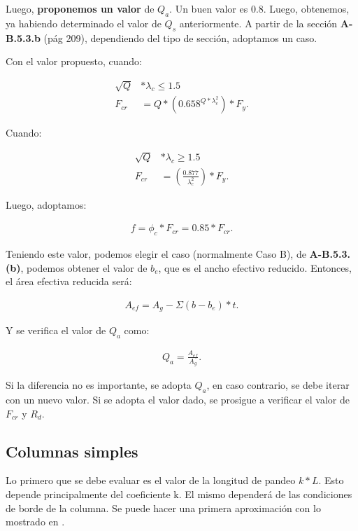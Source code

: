 \documentclass[../main.tex]{subfiles}
\begin{document}
Luego, \textbf{proponemos un valor} de $Q_a$. Un buen valor es 0.8. Luego,
obtenemos, ya habiendo determinado el valor de $Q_s$ anteriormente.
A partir de la sección \textbf{A-B.5.3.b} (pág 209), dependiendo del tipo de 
sección, adoptamos un caso.

Con el valor propuesto, cuando:

\begin{align*}
  \sqrt{Q} &* \lambda_c  \leq 1.5 \\[5pt]
  F_{cr} &= Q*\left( 0.658^{Q*\lambda_c^2} \right)*F_y \tag{A-B.5.15}
.\end{align*}

Cuando:

\begin{align*}
  \sqrt{Q} &* \lambda_c  \geq 1.5 \\[5pt]
  F_{cr} &= \left( \frac{0.877}{\lambda_c^2} \right) * F_y \tag{A-B.5.16}
.\end{align*}

Luego, adoptamos:

\begin{align*}
  f = \phi_c * F_{cr} = 0.85 * F_{cr}
.\end{align*}

Teniendo este valor, podemos elegir el caso (normalmente Caso B), de 
\textbf{A-B.5.3.(b)}, podemos obtener el valor de $b_e$, que es el ancho
efectivo reducido. Entonces, el área efectiva reducida será:

\begin{align*}
  A_{ef} = A_{g} - \Sigma (b-b_e)*t
.\end{align*}
 
Y se verifica el valor de $Q_a$ como:

 \begin{align*}
   Q_a = \frac{A_{ef}}{A_g}
.\end{align*}

Si la diferencia no es importante, se adopta $Q_a$, en caso contrario, se debe
iterar con un nuevo valor. Si se adopta el valor dado, se prosigue a verificar
el valor de $F_{cr}$ y $R_d$.

\subsection{Columnas simples}

Lo primero que se debe evaluar es el valor de la longitud de pandeo $k*L$. Esto
depende principalmente del coeficiente k. El mismo dependerá de las condiciones
de borde de la columna. Se puede hacer una primera aproximación con lo mostrado
en .
\end{document}
